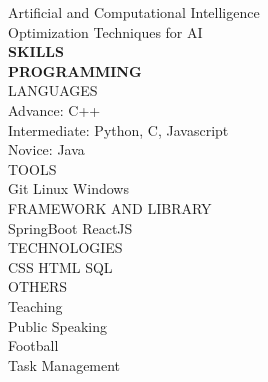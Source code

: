 \documentclass[a4paper, oneside, 11pt]{article}
\begin{document}
\begin{Parallel}{0.39\textwidth}{0.58\textwidth}
{    Artificial and Computational Intelligence \\
    Optimization Techniques for AI \\
	\noindent
    {\large \textbf{SKILLS}} \\
    \textbf {PROGRAMMING} \\
	\noindent
    LANGUAGES \\
    Advance: C++ \\
    Intermediate: Python, C, Javascript \\
    Novice: Java \\
	\noindent
    TOOLS \\
    \textbullet Git \textbullet Linux \textbullet Windows \\
	\noindent
    FRAMEWORK AND LIBRARY \\
    \textbullet SpringBoot \textbullet ReactJS \\
	\noindent
    TECHNOLOGIES \\
    \textbullet CSS \textbullet HTML \textbullet SQL \\
	\noindent
    OTHERS \\
    \textbullet Teaching \\
    \textbullet Public Speaking \\
    \textbullet Football \\
    \textbullet Task Management \\

    }
\end{Parallel}
\end{document}
